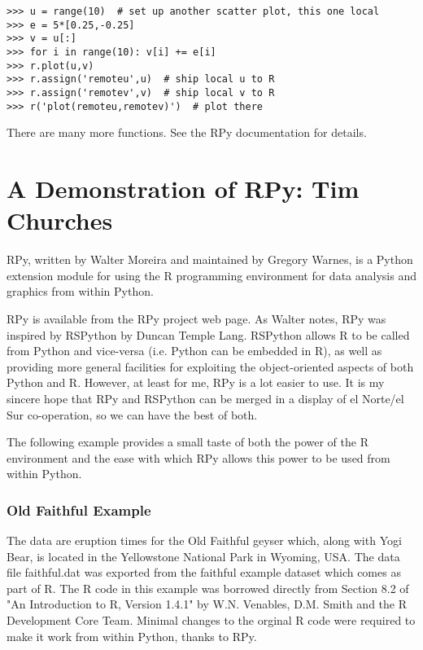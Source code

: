 \documentclass[a4paper,12pt]{article}
\begin{document}
\begin{verbatim}
>>> u = range(10)  # set up another scatter plot, this one local
>>> e = 5*[0.25,-0.25]
>>> v = u[:]
>>> for i in range(10): v[i] += e[i]
>>> r.plot(u,v)
>>> r.assign('remoteu',u)  # ship local u to R
>>> r.assign('remotev',v)  # ship local v to R
>>> r('plot(remoteu,remotev)')  # plot there
\end{verbatim}
There are many more functions. See the RPy documentation for details.

\newpage
\section{A Demonstration of RPy: Tim Churches}

RPy, written by Walter Moreira and maintained by Gregory Warnes, is a Python extension module for using the R programming environment for data analysis and graphics from within Python.

RPy is available from the RPy project web page. As Walter notes, RPy was inspired by RSPython by Duncan Temple Lang. RSPython allows R to be called from Python and vice-versa (i.e. Python can be embedded in R), as well as providing more general facilities for exploiting the object-oriented aspects of both Python and R. However, at least for me, RPy is a lot easier to use. It is my sincere hope that RPy and RSPython can be merged in a display of el Norte/el Sur co-operation, so we can have the best of both.

The following example provides a small taste of both the power of the R environment and the ease with which RPy allows this power to be used from within Python.
\subsubsection{Old Faithful Example}
The data are eruption times for the Old Faithful geyser which, along with Yogi Bear, is located in the Yellowstone National Park in Wyoming, USA. The data file faithful.dat was exported from the faithful example dataset which comes as part of R. The R code in this example was borrowed directly from Section 8.2 of "An Introduction to R, Version 1.4.1" by W.N. Venables, D.M. Smith and the R Development Core Team. Minimal changes to the orginal R code were required to make it work from within Python, thanks to RPy.
\end{document}
